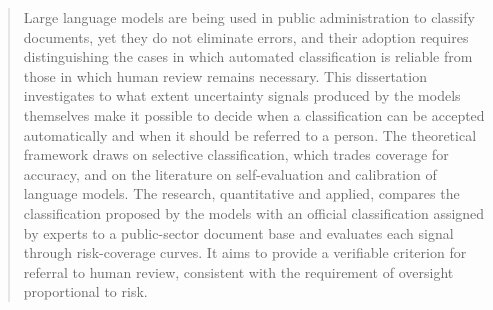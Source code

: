 
\begin{abstract}
Large language models are being used in public administration to classify
documents, yet they do not eliminate errors, and their adoption requires
distinguishing the cases in which automated classification is reliable from
those in which human review remains necessary. This dissertation investigates
to what extent uncertainty signals produced by the models themselves make it
possible to decide when a classification can be accepted automatically and
when it should be referred to a person. The theoretical framework draws on
selective classification, which trades coverage for accuracy, and on the
literature on self-evaluation and calibration of language models. The
research, quantitative and applied, compares the classification proposed by
the models with an official classification assigned by experts to a
public-sector document base and evaluates each signal through risk-coverage
curves. It aims to provide a verifiable criterion for referral to human
review, consistent with the requirement of oversight proportional to risk.
\end{abstract}
